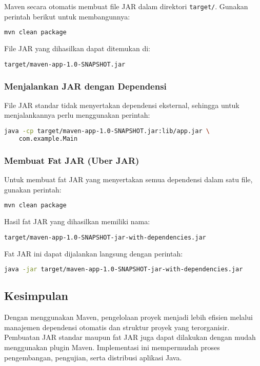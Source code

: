 Maven secara otomatis membuat file JAR dalam direktori \texttt{target/}. Gunakan perintah berikut untuk membangunnya:
\begin{lstlisting}[language=bash]
	mvn clean package
\end{lstlisting}

File JAR yang dihasilkan dapat ditemukan di:
\begin{lstlisting}[language=bash]
	target/maven-app-1.0-SNAPSHOT.jar
\end{lstlisting}

\subsubsection{Menjalankan JAR dengan Dependensi}

File JAR standar tidak menyertakan dependensi eksternal, sehingga untuk menjalankannya perlu menggunakan perintah:
\begin{lstlisting}[language=bash]
	java -cp target/maven-app-1.0-SNAPSHOT.jar:lib/app.jar \
	com.example.Main
\end{lstlisting}

\subsubsection{Membuat Fat JAR (Uber JAR)}

Untuk membuat fat JAR yang menyertakan semua dependensi dalam satu file, gunakan perintah:

\begin{lstlisting}[language=bash]
	mvn clean package
\end{lstlisting}

Hasil fat JAR yang dihasilkan memiliki nama:
\begin{lstlisting}[language=bash]
	target/maven-app-1.0-SNAPSHOT-jar-with-dependencies.jar
\end{lstlisting}

Fat JAR ini dapat dijalankan langsung dengan perintah:
\begin{lstlisting}[language=bash]
	java -jar target/maven-app-1.0-SNAPSHOT-jar-with-dependencies.jar
\end{lstlisting}

\subsection{Kesimpulan}

Dengan menggunakan Maven, pengelolaan proyek menjadi lebih efisien melalui manajemen dependensi otomatis dan struktur proyek yang terorganisir. Pembuatan JAR standar maupun fat JAR juga dapat dilakukan dengan mudah menggunakan plugin Maven. Implementasi ini mempermudah proses pengembangan, pengujian, serta distribusi aplikasi Java.



